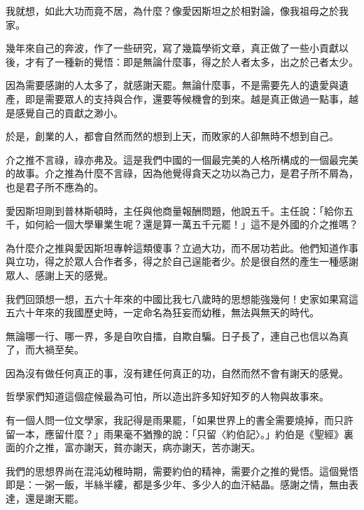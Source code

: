 \begin{acknowledgement}
我就想，如此大功而竟不居，為什麼？像愛因斯坦之於相對論，像我祖母之於我家。

幾年來自己的奔波，作了一些研究，寫了幾篇學術文章，真正做了一些小貢獻以後，才有了一種新的覺悟：即是無論什麼事，得之於人者太多，出之於己者太少。

因為需要感謝的人太多了，就感謝天罷。無論什麼事，不是需要先人的遺愛與遺產，即是需要眾人的支持與合作，還要等候機會的到來。越是真正做過一點事，越是感覺自己的貢獻之渺小。

於是，創業的人，都會自然而然的想到上天，而敗家的人卻無時不想到自己。

介之推不言祿，祿亦弗及。這是我們中國的一個最完美的人格所構成的一個最完美的故事。介之推為什麼不言祿，因為他覺得貪天之功以為己力，是君子所不屑為，也是君子所不應為的。

愛因斯坦剛到普林斯頓時，主任與他商量報酬問題，他說五千。主任說：「給你五千，如何給一個大學畢業生呢？還是算一萬五千元罷！」這不是外國的介之推嗎？

為什麼介之推與愛因斯坦專幹這類傻事？立過大功，而不居功若此。他們知道作事與立功，得之於眾人合作者多，得之於自己逞能者少。於是很自然的產生一種感謝眾人、感謝上天的感覺。

我們回頭想一想，五六十年來的中國比我七八歲時的思想能強幾何！史家如果寫這五六十年來的我國歷史時，一定命名為狂妄而幼稚，無法與無天的時代。

無論哪一行、哪一界，多是自吹自擂，自欺自騙。日子長了，連自己也信以為真了，而大禍至矣。

因為沒有做任何真正的事，沒有建任何真正的功，自然而然不會有謝天的感覺。

哲學家們知道這個症候最為可怕，所以造出許多知好知歹的人物與故事來。

有一個人問一位文學家，我記得是雨果罷，「如果世界上的書全需要燒掉，而只許留一本，應留什麼？」雨果毫不猶豫的說：「只留〈約伯記〉。」約伯是《聖經》裏面的介之推，富亦謝天，貧亦謝天，病亦謝天，苦亦謝天。

我們的思想界尚在混沌幼稚時期，需要約伯的精神，需要介之推的覺悟。這個覺悟即是：一粥一飯，半絲半縷，都是多少年、多少人的血汗結晶。感謝之情，無由表達，還是謝天罷。

\end{acknowledgement}